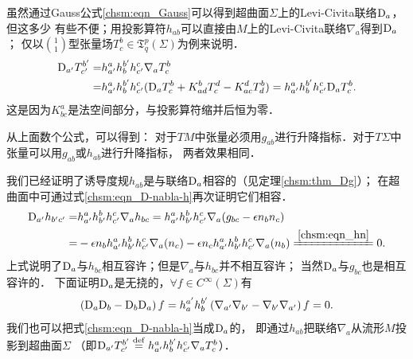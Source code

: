 虽然通过Gauss公式\eqref{chsm:eqn_Gauss}可以得到超曲面$\Sigma$上的Levi-Civita联络${\rm D}_a$，但这多少
有些不便；用投影算符$h_{ab}$可以直接由$M$上的Levi-Civita联络${\nabla}_{a}$得到${\rm D}_a$；
仅以$\binom{1}{1}$型张量场$T^b_c \in \mathfrak{T}^p_q(\Sigma)$为例来说明．
\begin{equation}\label{chsm:eqn_D-nabla-h}
    \begin{aligned}
    {\rm D}_{a'} {T}^{b'}_{c'} =& h_{a'}^a h^{b'}_b h_{c'}^c {\nabla}_{a} T^b_c \\
    =& h_{a'}^a h^{b'}_b h_{c'}^c ({\rm D}_{a} T^b_c  + K^b_{ad} T^d_c - K^d_{ac} T^b_d)
    =  h_{a'}^a h^{b'}_b h_{c'}^c {\rm D}_{a} {T}^b_c .
    \end{aligned}
\end{equation}
这是因为$K^a_{bc}$是法空间部分，与投影算符缩并后恒为零．

从上面数个公式，可以得到：
对于$TM$中张量必须用$g_{ab}$进行升降指标．对于$T\Sigma$中张量可以用$g_{ab}$或$h_{ab}$进行升降指标，
两者效果相同．


我们已经证明了诱导度规$h_{ab}$是与联络${\rm D}_a$相容的（见定理\ref{chsm:thm_Dg}）；
在超曲面中可通过式\eqref{chsm:eqn_D-nabla-h}再次证明它们相容．
\begin{align}
    {\rm D}_{a'} h_{b'c'} =& h_{a'}^a h_{b'}^b h_{c'}^c {\nabla}_{a} h_{bc}
    =  h_{a'}^a h_{b'}^b h_{c'}^c {\nabla}_{a} (g_{bc}- \epsilon {n}_b {n}_c) \notag \\
    =& - \epsilon {n}_b h_{a'}^a h_{b'}^b h_{c'}^c {\nabla}_{a} ( {n}_c)
       - \epsilon {n}_c h_{a'}^a h_{b'}^b h_{c'}^c {\nabla}_{a} ( {n}_b )
    \xlongequal{\ref{chsm:eqn_hn}}0 .
\end{align}
上式说明了${\rm D}_{a}$与$h_{bc}$相互容许；但是$\nabla_{a}$与$h_{bc}$并不相互容许；
当然${\rm D}_{a}$与$g_{bc}$也是相互容许的．
下面证明${\rm D}_{a}$是无挠的，$\forall f\in C^\infty(\Sigma)$有
\begin{equation}
    \left({\rm D}_{a}{\rm D}_{b}-{\rm D}_{b}{\rm D}_{a}\right) f
    =h^{a'}_a h^{b'}_b \left(\nabla_{a'}\nabla_{b'}-\nabla_{b'}\nabla_{a'}\right) f =0 .
\end{equation}
我们也可以把式\eqref{chsm:eqn_D-nabla-h}当成${\rm D}_{a}$的，
即通过$h_{ab}$把联络$\nabla_a$从流形$M$投影到超曲面$\Sigma$
（即${\rm D}_{a'} T^{b'}_{c'} \overset{\mathrm {def}}{=} h_{a'}^a h^{b'}_b h_{c'}^c {\nabla}_{a} T^b_c$）．



